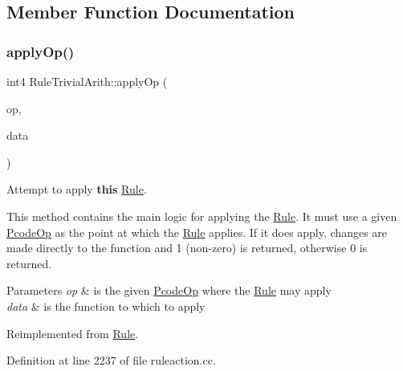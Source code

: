 \subsection{Member Function Documentation}
\mbox{\label{class_rule_trivial_arith_a692632ff3e5fa2bad3ba12b6ff2005be}} 
\subsubsection{\texorpdfstring{applyOp()}{applyOp()}}
{\footnotesize\ttfamily int4 Rule\+Trivial\+Arith\+::apply\+Op (\begin{DoxyParamCaption}\item[{\mbox{\hyperlink{class_pcode_op}{Pcode\+Op}} $\ast$}]{op,  }\item[{\mbox{\hyperlink{class_funcdata}{Funcdata}} \&}]{data }\end{DoxyParamCaption})\hspace{0.3cm}{\ttfamily [virtual]}}



Attempt to apply {\bfseries{this}} \mbox{\hyperlink{class_rule}{Rule}}. 

This method contains the main logic for applying the \mbox{\hyperlink{class_rule}{Rule}}. It must use a given \mbox{\hyperlink{class_pcode_op}{Pcode\+Op}} as the point at which the \mbox{\hyperlink{class_rule}{Rule}} applies. If it does apply, changes are made directly to the function and 1 (non-\/zero) is returned, otherwise 0 is returned. 
\begin{DoxyParams}{Parameters}
{\em op} & is the given \mbox{\hyperlink{class_pcode_op}{Pcode\+Op}} where the \mbox{\hyperlink{class_rule}{Rule}} may apply \\
\hline
{\em data} & is the function to which to apply \\
\hline
\end{DoxyParams}


Reimplemented from \mbox{\hyperlink{class_rule_a4e3e61f066670175009f60fb9dc60848}{Rule}}.



Definition at line 2237 of file ruleaction.\+cc.

